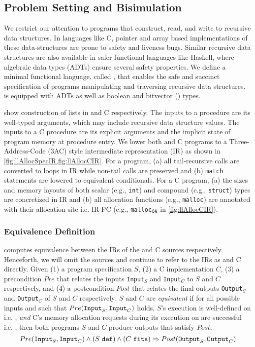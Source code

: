 \subsection{Problem Setting and Bisimulation}
\label{sec:syn-setting-bisimulation}
We restrict our attention to programs that construct, read, and write
to recursive data structures. In languages like C, pointer and array based
implementations of these data-structures are prone to safety and liveness bugs.
Similar recursive data structures are also available in safer functional languages like Haskell,
where algebraic data types (ADTs) \cite{hope} ensure several safety properties.
We define a minimal functional language, called \SpecL{}, that enables the safe
and succinct specification of programs manipulating and traversing recursive data structures.
\SpecL{} is equipped with ADTs as well as boolean and bitvector () types.



 show construction of lists in \SpecL{} and C respectively.
The inputs to a \SpecL{} procedure are its well-typed arguments, which may include recursive data structure
values. The inputs to a C procedure are its explicit arguments and the implicit state of program memory
at procedure entry. We lower both \SpecL{} and C programs to a
Three-Address-Code (3AC) style intermediate representation (IR)
as shown in \cref{fig:llAllocSpecIR,fig:llAllocCIR}. For a \SpecL{} program,
(a) all tail-recursive calls are converted to loops in IR while non-tail calls are preserved and
(b) {\tt match} statements are lowered to equivalent \sumDtor{} conditionals.
For a C program, (a) the sizes and memory layouts of both scalar (e.g., {\tt int})
and compound (e.g., {\tt struct}) types are concretized in IR and
(b) all allocation functions (e.g., {\tt malloc}) are annotated with their
allocation site i.e. IR PC (e.g., {\tt malloc$_{\tt C4}$} in \cref{fig:llAllocCIR}).

\subsubsection{Equivalence Definition}
\label{sec:syn-equivalence}
\toolName{} computes equivalence between the IRs of the \SpecL{} and C sources respectively.
Henceforth, we will omit the sources and continue to refer to the IRs as \SpecL{} and C directly.
Given (1) a \SpecL{} program specification $S$, (2) a C implementation $C$,
(3) a precondition $Pre$ that relates the inputs {\tt Input}$_S$ and {\tt Input}$_C$ to $S$ and $C$
respectively, and (4) a postcondition $Post$ that relates the final outputs {\tt Output}$_S$
and {\tt Output}$_C$ of $S$ and $C$ respectively:
$S$ and $C$ are {\em equivalent} if for all possible inputs  and  such that
$Pre({\tt Input}_{S},{\tt Input}_{C})$ holds,
$S$'s execution is well-defined on  i.e. \sdef{}, {\em and} C's
memory allocation requests during its execution on  are successful i.e. \cfits{},
then both programs $S$ and $C$ produce outputs
that satisfy $Post$.
$$
Pre({\tt Input}_{S},{\tt Input}_{C}) \land {(S\ {\tt def})}{} \land {(C\ {\tt fits})}{} \Rightarrow Post({\tt Output}_{S},{\tt Output}_{C})
$$

